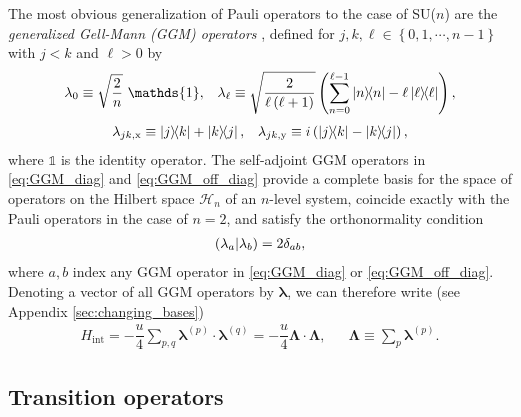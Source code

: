 \documentclass[nofootinbib,notitlepage,11pt]{revtex4-2}
\renewcommand{\t}{\text} %
\newcommand{\f}[2]{\dfrac{#1}{#2}} %
\newcommand{\p}[1]{\left(#1\right)} %
\renewcommand{\set}[1]{\left\{#1\right\}} %
\renewcommand{\v}{\bm} %
\renewcommand{\c}{\cdot} %
\newcommand{\1}{\mathds{1}}
\newcommand{\x}{\text{x}}
\newcommand{\y}{\text{y}}
\renewcommand{\H}{\mathcal{H}}
\def\obk#1{\mathinner{({#1})}}
\begin{document}
The most obvious generalization of Pauli operators to the case of
SU($n$) are the {\it generalized Gell-Mann (GGM) operators}
\cite{hioe1981level, bertlmann2008bloch}, defined for
$j,k,\ell\in\set{0,1,\cdots,n-1}$ with $j<k$ and $\ell>0$ by
\begin{align}
  \lambda_0 \equiv \sqrt{\f{2}{n}}~ \1,
  &&
  \lambda_\ell \equiv \sqrt{\f{2}{\ell\p{\ell+1}}}
  \p{\sum_{n=0}^{\ell-1}\op{n} - \ell \op{\ell}},
  \label{eq:GGM_diag}
\end{align}
\begin{align}
  \lambda_{jk,\x} \equiv \op{j}{k} + \op{k}{j},
  &&
  \lambda_{jk,\y} \equiv i\p{\op{j}{k} - \op{k}{j}},
  \label{eq:GGM_off_diag}
\end{align}
where $\1$ is the identity operator.  The self-adjoint GGM operators
in \eqref{eq:GGM_diag} and \eqref{eq:GGM_off_diag} provide a complete
basis for the space of operators on the Hilbert space $\H_n$ of an
$n$-level system, coincide exactly with the Pauli operators in the
case of $n=2$, and satisfy the orthonormality condition
\begin{align}
  \obk{\lambda_a|\lambda_b} = 2\delta_{ab},
  \label{eq:GGM_inner}
\end{align}
where $a,b$ index any GGM operator in \eqref{eq:GGM_diag} or
\eqref{eq:GGM_off_diag}.  Denoting a vector of all GGM operators by
$\v\lambda$, we can therefore write (see Appendix
\ref{sec:changing_bases})
\begin{align}
  H_{\t{int}}
  = -\f{u}{4} \sum_{p,q} \v\lambda^{(p)} \c \v\lambda^{(q)}
  = -\f{u}{4} \v\Lambda \c \v\Lambda,
  &&
  \v\Lambda \equiv \sum_p \v\lambda^{(p)}.
  \label{eq:H_int_GGM}
\end{align}

\subsection{Transition operators}
\label{sec:trans_ops}
\end{document}
